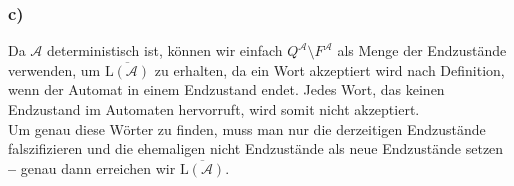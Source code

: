 \documentclass[12pt, a4paper]{article}
\newcommand*{\gedanke}{\textbf{-- }}
\begin{document}
\subsubsection*{c)}
Da \(\mathcal{A}\) deterministisch ist, können wir einfach \(Q^\mathcal{A} \setminus F^\mathcal{A}\) als Menge der Endzustände verwenden, um \(\overline{\text{L}(\mathcal A)}\) zu erhalten, da ein Wort akzeptiert wird nach Definition, wenn der Automat in einem Endzustand endet. Jedes Wort, das keinen Endzustand im Automaten hervorruft, wird somit nicht akzeptiert. \\
Um genau diese Wörter zu finden, muss man nur die derzeitigen Endzustände falszifizieren und die ehemaligen nicht Endzustände als neue Endzustände setzen \gedanke genau dann erreichen wir \(\overline{\text{L}(\mathcal A)}\).
\end{document}

